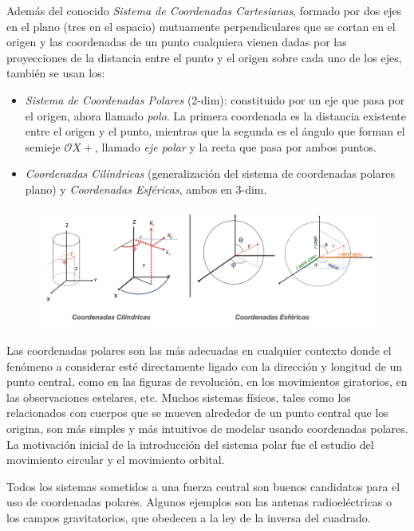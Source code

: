 Además del conocido \emph{Sistema de Coordenadas Cartesianas}, formado por dos ejes en el plano (tres en el espacio) mutuamente perpendiculares que se cortan en el origen y las coordenadas de un punto cualquiera vienen dadas por las proyecciones de la distancia entre el punto y el origen sobre cada uno de los ejes, también se usan los:

\begin{itemize}

\item \emph{Sistema de Coordenadas Polares} (2-dim): constituido por un eje que pasa por el origen, ahora llamado \emph{polo}. La primera coordenada es la distancia existente entre el origen y el punto, mientras que la segunda es el ángulo que forman el semieje $\mathcal {O}X+$, llamado \emph{eje polar}  y la recta que pasa por ambos puntos.



\item \emph{Coordenadas Cilíndricas} (generalización del sistema de coordenadas polares plano) y \emph{Coordenadas Esféricas}, ambos en 3-dim.
\end{itemize}


\begin{figure}[H]
	\centering
	\includegraphics[width=.8\textwidth]{img-polares/polares18.png}
	\end{figure}

\textsf{Las coordenadas polares son las más adecuadas en cualquier contexto donde el fenómeno a considerar esté directamente ligado con la dirección y longitud de un punto central, como en las figuras de revolución, en los movimientos giratorios, en las observaciones estelares, etc.  Muchos sistemas físicos, tales como los relacionados con cuerpos que se mueven alrededor de un punto central que los origina, son más simples y más intuitivos de modelar usando coordenadas polares. La motivación inicial de la introducción del sistema polar fue el estudio del movimiento circular y el movimiento orbital.}

\textsf{Todos los  sistemas sometidos a una fuerza central son buenos candidatos para el uso de coordenadas polares. Algunos ejemplos son las antenas radioeléctricas o los campos gravitatorios, que obedecen a la ley de la inversa del cuadrado.}

